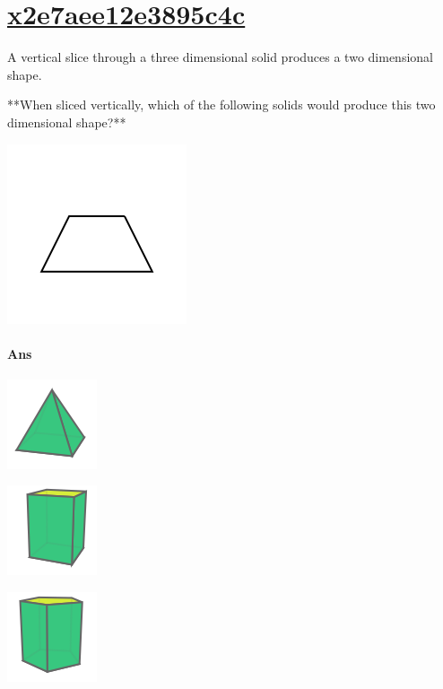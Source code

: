 \documentclass[twocolumn,10pt]{article}
\def\shrinkfactor{0.55}
\begin{document}
\section{\href{https://www.khanacademy.org/devadmin/content/items/x2e7aee12e3895c4c}{x2e7aee12e3895c4c}}

\noindent
A vertical slice through a three dimensional solid produces a two dimensional shape.

**When sliced vertically, which of the following solids would produce this two dimensional shape?**   

\includegraphics[scale=\shrinkfactor]{figures/9a01e5fee86b7569b86f7e8f116595d328925a8c.png} 


\paragraph{Ans} 


\includegraphics[scale=\shrinkfactor]{figures/49b99cca0c4e580ceaef3d4fd5842ea463191ce8.png}


\includegraphics[scale=\shrinkfactor]{figures/5f94871e71f674049268d58ac56b3de4dfa3a3ba.png}


\includegraphics[scale=\shrinkfactor]{figures/714aa411c23dfb02df032183d703d78050ecb5ae.png}
\end{document}
